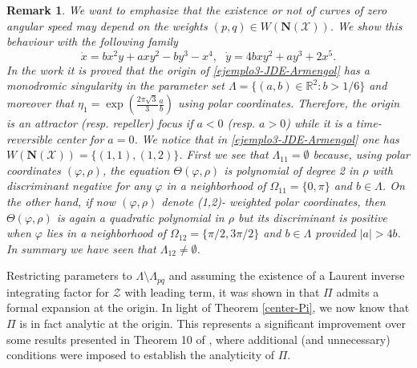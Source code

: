 \documentclass[12pt]{amsart}
\newtheorem {remark} [theorem]{\sc Remark}
\begin{document}
\begin{remark}
{\rm We want to emphasize that the existence or not of curves of zero angular speed may depend on the weights $(p,q) \in W(\mathbf{N}(\mathcal{X}))$. We show this behaviour with the following family
\begin{equation}\label{ejemplo3-JDE-Armengol}
\dot{x} = b x^2 y + a x y^2 - b y^3 - x^4, \ \ \ \dot{y} = 4 b x y^2 + a y^3 + 2 x^5.
\end{equation}
In the work \cite{Ga-Ma-Ma} it is proved that the origin of \eqref{ejemplo3-JDE-Armengol} has a monodromic singularity in the parameter set $\Lambda = \{ (a, b) \in \mathbb{R}^2 : b > 1/6 \}$ and moreover that $\eta_1 = \exp\left( \frac{2 \pi \sqrt{3}}{3} \frac{a}{b} \right)$ using polar coordinates. Therefore, the origin is an attractor (resp. repeller) focus if $a < 0$ (resp. $a > 0$) while it is a time-reversible center for $a=0$. We notice that in \eqref{ejemplo3-JDE-Armengol}  one has $W(\mathbf{N}(\mathcal{X})) = \{ (1,1), (1,2) \}$. First we see that $\Lambda_{11} = \emptyset$ because, using polar coordinates $(\varphi, \rho)$, the equation $\Theta(\varphi, \rho)$ is polynomial of degree 2 in $\rho$ with discriminant negative for any $\varphi$ in a neighborhood of $\Omega_{11} = \{0, \pi\}$ and $b \in \Lambda$. On the other hand, if now $(\varphi, \rho)$ denote (1,2)- weighted polar coordinates, then $\Theta(\varphi, \rho)$ is again a quadratic polynomial in $\rho$ but its discriminant is positive when $\varphi$ lies in a neighborhood of $\Omega_{12} = \{\pi/2, 3 \pi/2\}$ and $b \in \Lambda$ provided $|a| > 4 b$. In summary we have seen that $\Lambda_{12} \neq \emptyset$. }
\end{remark}

Restricting parameters to $\Lambda \setminus \Lambda_{pq}$ and assuming the existence of a Laurent inverse integrating factor for $\mathcal{Z}$ with leading term, it was shown in \cite{GaGi4} that $\Pi$ admits a formal expansion at the origin. In light of Theorem \ref{center-Pi}, we now know that $\Pi$ is in fact analytic at the origin. This represents a significant improvement over some results presented in Theorem 10 of \cite{GaGi4}, where additional (and unnecessary) conditions were imposed to establish the analyticity of $\Pi$.
\end{document}
